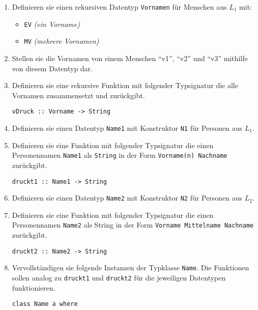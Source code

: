 \documentclass{article}
\begin{document}
\begin{enumerate} [label={\alph*)}]
    \item Definieren sie einen rekursiven Datentyp \texttt{Vornamen} für Menschen aus \textit{$L_{1}$} mit:
        \begin{itemize}
            \item \texttt{EV} \textit{(ein Vorname)}
            \item \texttt{MV} \textit{(mehrere Vornamen)}
        \end{itemize}

    \item Stellen sie die Vornamen von einem Menschen ``v1'', ``v2'' und ``v3'' mithilfe von diesem Datentyp dar.

    \item Definieren sie eine rekursive Funktion mit folgender Typsignatur die alle Vornamen zusammensetzt und zurückgibt.
\begin{verbatim}
vDruck :: Vorname -> String
\end{verbatim}

    \item Definieren sie einen Datentyp \texttt{Name1} mit Konstruktor \texttt{N1} für Personen aus \textit{$L_{1}$}.\\[2mm]

    \item Definieren sie eine Funktion mit folgender Typsignatur die einen Personennamen \texttt{Name1} als \texttt{String} in der Form \texttt{Vorname(n) Nachname} zurückgibt.
\begin{verbatim}
druckt1 :: Name1 -> String
\end{verbatim}

    \item Definieren sie einen Datentyp \texttt{Name2} mit Konstruktor \texttt{N2} für Personen aus  \textit{$L_{2}$}.\\[2mm]

    \item Definieren sie eine Funktion mit folgender Typsignatur die einen Personennamen \texttt{Name2} als String in der Form \texttt{Vorname Mittelname Nachname} zurückgibt.
\begin{verbatim}
druckt2 :: Name2 -> String
\end{verbatim}

    \item Vervollständigen sie folgende Instanzen der Typklasse \texttt{Name}. Die Funktionen sollen analog zu \texttt{druckt1} und \texttt{druckt2} für die jeweiligen Datentypen funktionieren.
\begin{verbatim}
class Name a where
    

\end{verbatim}
\end{enumerate}
\end{document}
